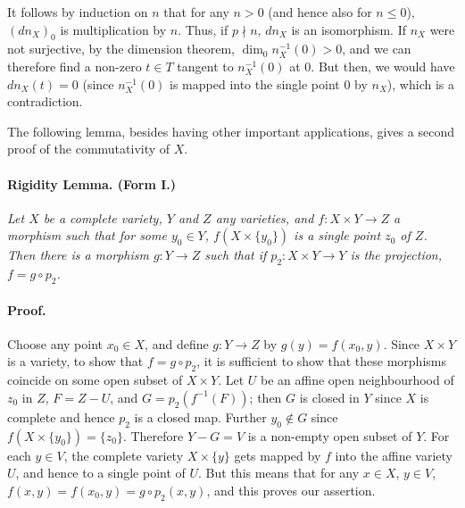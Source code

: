 

It follows by induction on $n$ that for any $n > 0$ (and hence also for
$n \le 0$), $(dn_X)_0$ is multiplication by $n$. Thus, if $p \nmid n$, $dn_X$
is an isomorphism. If $n_X$ were not surjective, by the dimension theorem,
$\dim_0 n_X^{-1}(0) > 0$, and we can therefore find a non-zero $t \in T$
tangent to $n_X^{-1}(0)$ at $0$. But then, we would have $dn_X(t) = 0$
(since $n_X^{-1}(0)$ is mapped into the single point $0$ by $n_X$), which is
a contradiction.

The following lemma, besides having other important applications, gives a
second proof of the commutativity of $X$.

\paragraph{Rigidity Lemma. (Form I.)}
\textit{Let $X$ be a complete variety, $Y$ and $Z$ any varieties, and
$f : X \times Y \to Z$ a morphism such that for some $y_0 \in Y$,
$f(X \times \{y_0\})$ is a single point $z_0$ of $Z$. Then there is a
morphism $g : Y \to Z$ such that if $p_2 : X \times Y \to Y$ is the
projection, $f = g \circ p_2$.}

\paragraph{Proof.}
Choose any point $x_0 \in X$, and define $g : Y \to Z$ by
$g(y) = f(x_0, y)$. Since $X \times Y$ is a variety, to show that
$f = g \circ p_2$, it is sufficient to show that these morphisms coincide on
some open subset of $X \times Y$. Let $U$ be an affine open neighbourhood of
$z_0$ in $Z$, $F = Z - U$, and $G = p_2(f^{-1}(F))$; then $G$ is closed in
$Y$ since $X$ is complete and hence $p_2$ is a closed map. Further
$y_0 \notin G$ since $f(X \times \{y_0\}) = \{z_0\}$. Therefore
$Y - G = V$ is a non-empty open subset of $Y$. For each $y \in V$, the
complete variety $X \times \{y\}$ gets mapped by $f$ into the affine variety
$U$, and hence to a single point of $U$. But this means that for any
$x \in X$, $y \in V$, $f(x, y) = f(x_0, y) = g \circ p_2(x, y)$, and this
proves our assertion.

